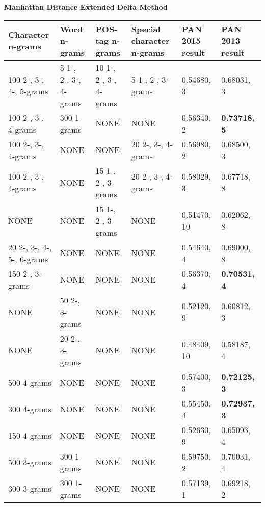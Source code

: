 \begin{landscape}
\begin{table}
    \centering
    \textbf{Manhattan Distance Extended Delta Method}\par\medskip
    \small
    \begin{tabular}{llll|ll}
        \textbf{Character n-grams} & \textbf{Word n-grams} &
        \textbf{POS-tag n-grams} & \textbf{Special character n-grams} &
        \textbf{PAN 2015 result} & \textbf{PAN 2013 result} \\
        \hline
        100 2-, 3-, 4-, 5-grams & 5 1-, 2-, 3-, 4-grams &
        10 1-, 2-, 3-, 4-grams & 5 1-, 2-, 3-grams & 0.54680, 3 & 0.68031, 3 \\
        100 2-, 3-, 4-grams & 300 1-grams & NONE & NONE & 0.56340, 2 &
        \textbf{0.73718, 5} \\
        100 2-, 3-, 4-grams & NONE & NONE & 20 2-, 3-, 4-grams &
        0.56980, 2 & 0.68500, 3 \\
        100 2-, 3-, 4-grams & NONE & 15 1-, 2-, 3-grams & 20 2-, 3-, 4-grams &
        0.58029, 3 & 0.67718, 8 \\
        NONE & NONE & 15 1-, 2-, 3-grams & NONE & 0.51470, 10 & 0.62062, 8 \\
        20 2-, 3-, 4-, 5-, 6-grams & NONE & NONE & NONE & 0.54640, 4 &
        0.69000, 8 \\
        150 2-, 3-grams & NONE & NONE & NONE & 0.56370, 4 &
        \textbf{0.70531, 4} \\
        NONE & 50 2-, 3-grams & NONE & NONE & 0.52120, 9 & 0.60812, 3 \\
        NONE & 20 2-, 3-grams & NONE & NONE & 0.48409, 10 & 0.58187, 4 \\
        500 4-grams & NONE & NONE & NONE & 0.57400, 3 & \textbf{0.72125, 3} \\
        300 4-grams & NONE & NONE & NONE & 0.55450, 4 & \textbf{0.72937, 3} \\
        150 4-grams & NONE & NONE & NONE & 0.52630, 9 & 0.65093, 4 \\
        500 3-grams & 300 1-grams & NONE & NONE & 0.59750, 2 & 0.70031, 4 \\
        300 3-grams & 300 1-grams & NONE & NONE & 0.57139, 1 & 0.69218, 2 \\

\end{tabular}
\end{table}
\end{landscape}

